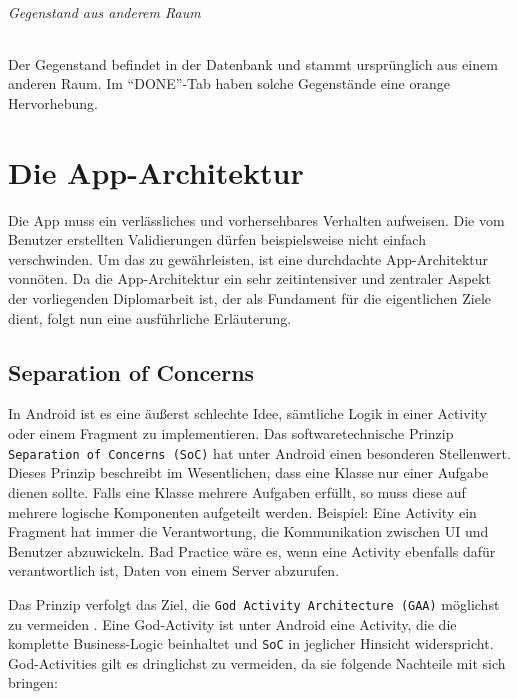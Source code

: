 \hypertarget{gegenstand-aus-anderem-raum}{%
\subparagraph{Gegenstand aus anderem
Raum}\label{gegenstand-aus-anderem-raum}}

Der Gegenstand befindet in der Datenbank und stammt ursprünglich aus
einem anderen Raum. Im ``DONE''-Tab haben solche Gegenstände eine orange
Hervorhebung.

\chapter{Die App-Architektur}
\label{die_app_architektur}

Die App muss ein verlässliches und vorhersehbares Verhalten aufweisen.
Die vom Benutzer erstellten Validierungen dürfen beispielsweise nicht
einfach verschwinden. Um das zu gewährleisten, ist eine durchdachte
App-Architektur vonnöten. Da die App-Architektur ein sehr zeitintensiver
und zentraler Aspekt der vorliegenden Diplomarbeit ist, der als
Fundament für die eigentlichen Ziele dient, folgt nun eine ausführliche
Erläuterung.

\hypertarget{separation-of-concerns}{%
\section{Separation of Concerns}\label{separation-of-concerns}}

In Android ist es eine äußerst schlechte Idee, sämtliche Logik in einer
Activity oder einem Fragment zu implementieren. Das softwaretechnische
Prinzip \texttt{Separation\ of\ Concerns\ (SoC)} hat unter Android einen
besonderen Stellenwert. Dieses Prinzip beschreibt im Wesentlichen, dass
eine Klasse nur einer Aufgabe dienen sollte. Falls eine Klasse mehrere
Aufgaben erfüllt, so muss diese auf mehrere logische Komponenten
aufgeteilt werden. Beispiel: Eine Activity \bzw ein Fragment hat immer
die Verantwortung, die Kommunikation zwischen UI und Benutzer
abzuwickeln. Bad Practice wäre es, wenn eine Activity ebenfalls dafür
verantwortlich ist, Daten von einem Server abzurufen.

Das Prinzip verfolgt das Ziel, die
\texttt{God\ Activity\ Architecture\ (GAA)} möglichst zu vermeiden
\cite{god-activities}. Eine God-Activity ist unter Android eine
Activity, die die komplette Business-Logic beinhaltet und \texttt{SoC}
in jeglicher Hinsicht widerspricht. God-Activities gilt es dringlichst
zu vermeiden, da sie folgende Nachteile mit sich bringen:

